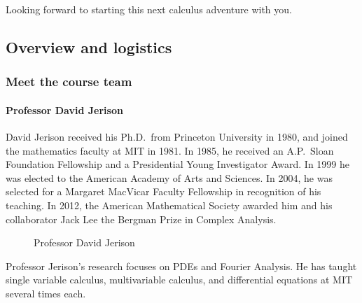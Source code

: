 \documentclass[pdftex, brazil, 12pt, twoside]{article}
\begin{document}
Looking forward to starting this next calculus adventure with you. 


\subsection{Overview and logistics}
\label{gs-ol}

\subsubsection{Meet the course team}
\label{gs-ol-team}

\paragraph{Professor David Jerison}
David Jerison received his Ph.D.\ from Princeton University in 1980, and joined the
mathematics faculty at MIT in 1981. In 1985, he received an A.P.\ Sloan Foundation
Fellowship and a Presidential Young Investigator Award. In 1999 he was elected to the
American Academy of Arts and Sciences. In 2004, he was selected for a Margaret MacVicar
Faculty Fellowship in recognition of his teaching. In 2012, the American Mathematical
Society awarded him and his collaborator Jack Lee the Bergman Prize in Complex Analysis.

\begin{figure}[H]
  \begin{center}
    \caption{Professor David Jerison}
    \label{fig:david-jerison}
  \end{center}
\end{figure}

Professor Jerison's research focuses on PDEs and Fourier Analysis. He has taught single
variable calculus, multivariable calculus, and differential equations at MIT several
times each.
\end{document}
